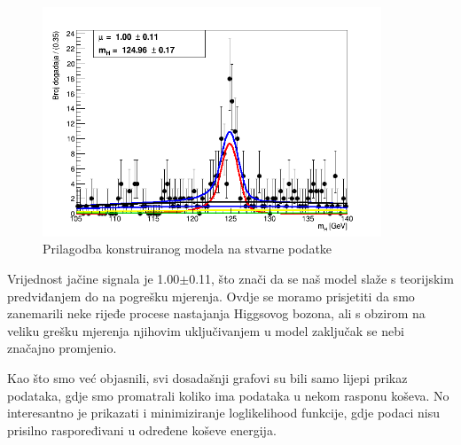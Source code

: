 \documentclass[12pt,a4paper,oneside]{article}
\begin{document}
\begin{linenumbers}
		\begin{figure}[H]
			\centering
			\includegraphics[width=0.9\textwidth]{27-8.png}
			\caption[Saturn viđen u ultraljubičastom svjetlu.]{\label{sl:sl7} Prilagodba konstruiranog modela na stvarne podatke}
		\end{figure}
		 
		 Vrijednost jačine signala je 1.00$\pm$0.11, što znači da se naš model slaže s teorijskim predviđanjem do na pogrešku mjerenja. Ovdje se moramo prisjetiti da smo zanemarili neke rijeđe procese nastajanja Higgsovog bozona, ali s obzirom na veliku grešku mjerenja njihovim uključivanjem u model zaključak se nebi značajno promjenio.
		 
		 Kao što smo već objasnili, svi dosadašnji grafovi su bili samo lijepi prikaz podataka, gdje smo promatrali koliko ima podataka u nekom rasponu koševa. No interesantno je prikazati i minimiziranje loglikelihood funkcije, gdje podaci nisu prisilno raspoređivani u određene koševe energija.
		 

\end{linenumbers}
\end{document}
